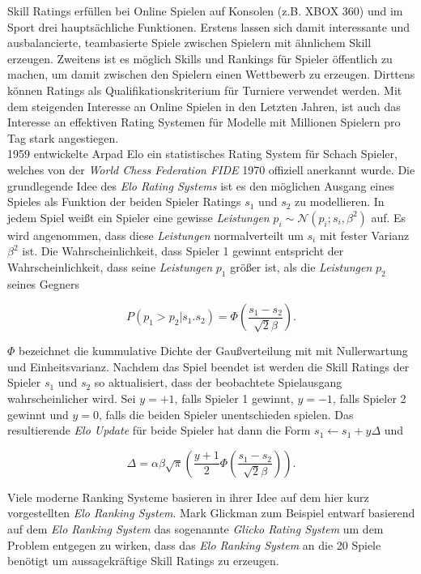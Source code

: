 \documentclass[12pt,a4paper]{scrartcl}
\numberwithin{equation}{section}
\begin{document}
Skill Ratings erfüllen bei Online Spielen auf Konsolen (z.B. XBOX 360) und im Sport drei hauptsächliche Funktionen. Erstens lassen sich damit interessante und ausbalancierte, teambasierte
Spiele zwischen Spielern mit ähnlichem Skill erzeugen. Zweitens ist es möglich Skills und Rankings für Spieler öffentlich zu machen, um damit zwischen den Spielern einen Wettbewerb zu erzeugen. 
Dirttens können Ratings als Qualifikationskriterium für Turniere verwendet werden. 
Mit dem steigenden Interesse an Online Spielen in den Letzten Jahren, ist auch das Interesse an effektiven Rating Systemen für Modelle mit Millionen Spielern pro Tag 
stark angestiegen.\\
1959 entwickelte Arpad Elo ein statistisches Rating System für Schach Spieler, welches von der \textit{World Chess Federation FIDE} 1970 offiziell anerkannt wurde.
Die grundlegende Idee des \textit{Elo Rating Systems} ist es den möglichen Ausgang eines Spieles als Funktion der beiden Spieler Ratings $s_1$ und $s_2$ zu modellieren. 
In jedem Spiel weißt ein Spieler eine gewisse \textit{Leistungen} $p_i \sim \mathcal{N}(p_i;s_i,\beta^2)$ auf. Es wird angenommen, dass diese \textit{Leistungen} normalverteilt um $s_i$ mit
fester Varianz $\beta^2$ ist. Die Wahrscheinlichkeit, dass Spieler 1 gewinnt entspricht der Wahrscheinlichkeit, dass seine \textit{Leistungen} $p_1$ größer ist, als die \textit{Leistungen} $p_2$ 
seines Gegners

\begin{equation}
 P(p_1 > p_2 | s_1. s_2) = \varPhi(\frac{s_1 - s_2}{\sqrt{2}\beta}).
\end{equation}

$\varPhi$ bezeichnet die kummulative Dichte der Gaußverteilung mit mit Nullerwartung und Einheitsvarianz.
Nachdem das Spiel beendet ist werden die Skill Ratings der Spieler $s_1$ und $s_2$ so aktualisiert, dass der beobachtete Spielausgang wahrscheinlicher wird. 
Sei $y = +1$, falls Spieler 1 gewinnt, $y = -1$, falls Spieler 2 gewinnt und $y = 0$, falls die beiden Spieler unentschieden spielen. 
Das resultierende \textit{Elo Update} für beide Spieler hat dann die Form $s_1 \leftarrow s_1 + y \Delta$ und 

\begin{equation}
 \Delta = \alpha \beta \sqrt{\pi} (\frac{y+1}{2} \varPhi(\frac{s_1 - s_2}{\sqrt{2} \beta})).
\end{equation}

Viele moderne Ranking Systeme basieren in ihrer Idee auf dem hier kurz vorgestellten \textit{Elo Ranking System}.
Mark Glickman zum Beispiel entwarf basierend auf dem \textit{Elo Ranking System} das sogenannte \textit{Glicko Rating System} um dem  Problem entgegen zu wirken, dass das \textit{Elo Ranking System} an die 20 Spiele
benötigt um aussagekräftige Skill Ratings zu erzeugen. \\
\end{document}
